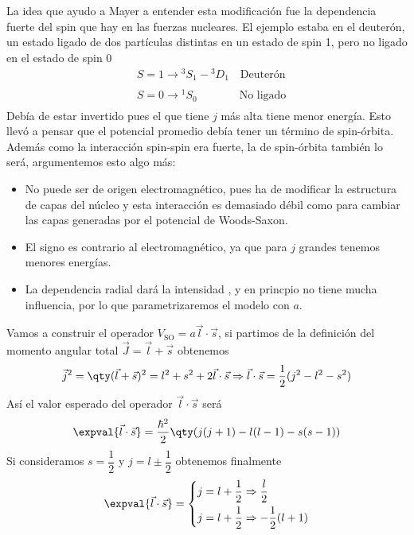 \\\\
La idea que ayudo a Mayer a entender esta modificación fue la dependencia fuerte del spin que hay en las fuerzas nucleares. El ejemplo estaba en el deuterón, un estado ligado de dos partículas distintas en un estado de spin 1, pero no ligado en el estado de spin 0 $$ \begin{aligned}
    &S=1 \xrightarrow[]{} {}^3S_1-{}^3D_1\quad \text{Deuterón}\\
    &S=0 \xrightarrow[]{} {}^1S_0 \quad \quad \quad \ \; \;\text{No ligado}
\end{aligned}$$ 
Debía de estar invertido pues el que tiene $j$ más alta tiene menor energía. Esto llevó a pensar que el potencial promedio debía tener un término de spin-órbita. Además como la interacción spin-spin era fuerte, la de spin-órbita también lo será, argumentemos esto algo más:
\begin{itemize}
    \item No puede ser de origen electromagnético, pues ha de modificar la estructura de capas del núcleo y esta interacción es demasiado débil como para cambiar las capas generadas por el potencial de Woods-Saxon.
    \item El signo es contrario al electromagnético, ya que para $j$ grandes tenemos menores energías.
    \item La dependencia radial dará la intensidad , y en princpio no tiene mucha influencia, por lo que parametrizaremos el modelo con $a$.
\end{itemize}

Vamos a construir el operador $V_\mathrm{SO}=a{\vec{l}\cdot \vec{s}}$, si partimos de la definición del momento angular total $\vec{J}=\vec{l}+\vec{s}$ obtenemos
\begin{equation*}
    \vec{j}^2=\qty(\vec{l}+\vec{s})^2=l^2+s^2+2\vec{l}\cdot \vec{s}\Rightarrow \vec{l}\cdot \vec{s}=\frac{1}{2}(j^2-l^2-s^2)
\end{equation*}
Así el valor esperado del operador $\vec{l}\cdot \vec{s}$ será
\begin{equation*}
\expval{\vec{l}\cdot \vec{s}}=\frac{\hbar^2}{2}\qty(j(j+1)-l(l-1)-s(s-1))
\end{equation*}
Si consideramos $s=\dfrac{1}{2}$ y $j=l\pm \dfrac{1}{2}$ obtenemos finalmente
\begin{equation}
    \expval{\vec{l}\cdot \vec{s}} = \left \{ \begin{aligned}
    &j=l+\frac{1}{2} \Rightarrow \frac{l}{2}\\
    &j=l+\frac{1}{2} \Rightarrow  -\frac{1}{2}(l+1)
\end{aligned}\right.
\label{eq: valor esperado operador spin orbita}
\end{equation}

